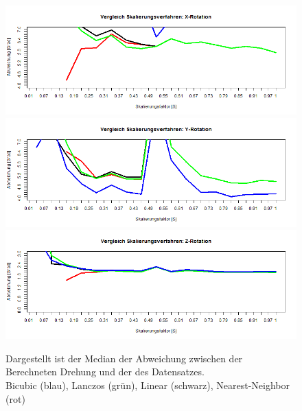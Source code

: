 \begin{figure}
	\centering
	\includegraphics[width=\linewidth]{img_Skalierung/Skal_Diff_RX}
	\includegraphics[width=\linewidth]{img_Skalierung/Skal_Diff_RY}
	\includegraphics[width=\linewidth]{img_Skalierung/Skal_Diff_RZ}
	\caption{Dargestellt ist der Median der Abweichung zwischen der Berechneten Drehung und der des Datensatzes.\\
		Bicubic (blau), Lanczos (grün), Linear (schwarz), Nearest-Neighbor (rot)}
	\label{img_Rot_Dif}
\end{figure}
